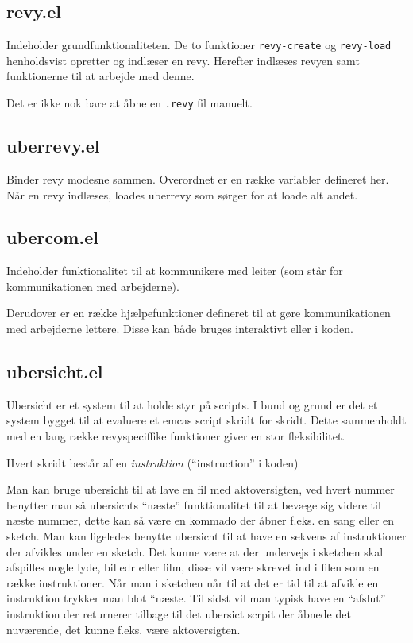 \documentclass[10pt,a4paper,danish]{article}
\newcommand{\code}[1]{\colorbox{verbgray}{\texttt{#1}}}
\begin{document}
\subsection{revy.el}
Indeholder grundfunktionaliteten. De to funktioner \code{revy-create} og
\code{revy-load} henholdsvist opretter og indlæser en revy. Herefter indlæses
revyen samt funktionerne til at arbejde med denne.

Det er ikke nok bare at åbne en \code{.revy} fil manuelt.

\subsection{uberrevy.el}
Binder revy modesne sammen. Overordnet er en række variabler defineret her. Når
en revy indlæses, loades uberrevy som sørger for at loade alt andet.

\subsection{ubercom.el}
Indeholder funktionalitet til at kommunikere med leiter (som står for
kommunikationen med arbejderne).

Derudover er en række hjælpefunktioner defineret til at gøre kommunikationen med
arbejderne lettere. Disse kan både bruges interaktivt eller i koden.

\subsection{ubersicht.el}
Ubersicht er et system til at holde styr på scripts. I bund og grund er det et
system bygget til at evaluere et emcas script skridt for skridt. Dette
sammenholdt med en lang række revyspeciffike funktioner giver en stor
fleksibilitet.

Hvert skridt består af en \textit{instruktion} (``instruction'' i koden)

Man kan bruge ubersicht til at lave en fil med aktoversigten, ved hvert nummer
benytter man så ubersichts ``næste'' funktionalitet til at bevæge sig videre til
næste nummer, dette kan så være en kommado der åbner f.eks. en sang eller en
sketch. Man kan ligeledes benytte ubersicht til at have en sekvens af
instruktioner der afvikles under en sketch. Det kunne være at der undervejs i
sketchen skal afspilles nogle lyde, billedr eller film, disse vil være skrevet
ind i filen som en række instruktioner. Når man i sketchen når til at det er tid
til at afvikle en instruktion trykker man blot ``næste. Til sidst vil man typisk
have en ``afslut'' instruktion der returnerer tilbage til det ubersict scrpit
der åbnede det nuværende, det kunne f.eks. være aktoversigten.
\end{document}
